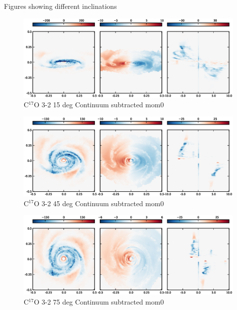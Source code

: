 \documentclass[useAMS,usenatbib]{mn2e}
\begin{document}
Figures showing different inclinations 
\begin{figure}
 \includegraphics[width=198mm]{Figures/sim/imageC17O_3-2_15deg_all.eps}

 \caption{C$^{17}$O 3-2 15 deg Continuum subtracted mom0}
\end{figure}

\begin{figure}
 \includegraphics[width=198mm]{Figures/sim/imageC17O_3-2_45deg_all.eps}

 \caption{C$^{17}$O 3-2 45 deg Continuum subtracted mom0}
\end{figure}

\begin{figure}
 \includegraphics[width=198mm]{Figures/sim/imageC17O_3-2_75deg_all.eps}

 \caption{C$^{17}$O 3-2 75 deg Continuum subtracted mom0}
\end{figure}
\end{document}
